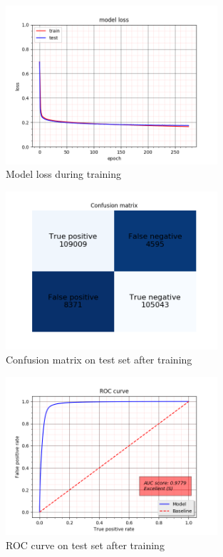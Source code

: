 \begin{figure}[H]
\center
\includegraphics[width=0.7\textwidth]{pictures/train_loss.png}
\caption{\label{fig:train_loss}Model loss during training}
\end{figure}

\begin{figure}[H]
\center
\includegraphics[width=0.7\textwidth]{pictures/train_cm.png}
\caption{\label{fig:train_cm}Confusion matrix on test set after training}
\end{figure}

\begin{figure}[H]
\center
\includegraphics[width=0.7\textwidth]{pictures/train_roc.png}
\caption{\label{fig:train_roc}ROC curve on test set after training}
\end{figure}

